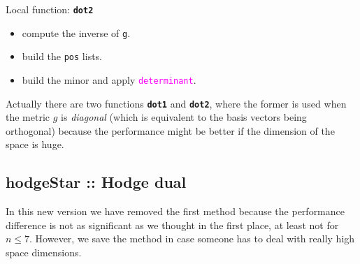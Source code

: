 \documentclass[12pt,a4paper]{article}
\newcommand{\spadfun}[1]{\textcolor{magenta}{\tt #1}}
\newcommand{\spadbold}[1]{{\tt\bf #1}}
\begin{document}
\noindent Local function: \spadbold{dot2}
\begin{itemize}
\item compute the inverse of {\tt g}.
\item build the {\tt pos} lists.
\item build the minor and apply \spadfun{determinant}.
\end{itemize}
Actually there are two functions \spadbold{dot1} and \spadbold{dot2}, 
where the former is used when the metric $g$ is {\it diagonal} 
(which is equivalent to the basis vectors being orthogonal) because 
the performance might be better if the dimension of the space is huge.
%
\subsection{hodgeStar :: Hodge dual}
In this new version we have removed the first method because the
performance difference is not as significant as we thought in the first
place, at least not for $n\leq 7$. However, we save the method in
case someone has to deal with really high space dimensions.
\end{document}
